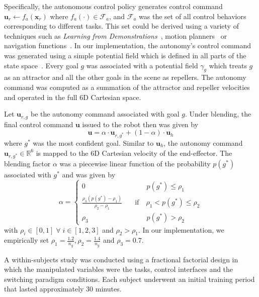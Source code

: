 \documentclass[journal]{IEEEtran}
\begin{document}
Specifically, the autonomous control policy generates control command $\boldsymbol{u}_r \leftarrow f_{a}(\boldsymbol{x}_r)$
where $f_{a}(\cdot) \in \mathcal{F}_{a}$, and $\mathcal{F}_{a}$ was the set of all control behaviors corresponding to different tasks. This set could be derived using a variety of techniques such as \textit{Learning from Demonstrations}~\cite{argall2009survey, schaal1997learning}, motion planners~\cite{hsu2002randomized,ratliff2009chomp} or navigation functions~\cite{rimon1992exact,tanner2003nonholonomic}.
In our implementation, the autonomy's control command was generated using a simple potential field which is defined in all parts of the state space~\cite{khatib1986real}. Every goal $g$ was associated with a potential field $\gamma_g$ which treats $g$ as an attractor and all the other goals in the scene as repellers. The autonomy command was computed as a summation of the attractor and repeller velocities and operated in the full 6D Cartesian space. 

Let $\boldsymbol{u}_{r,g}$ be the autonomy command associated with goal $g$. Under blending, the final control command $\boldsymbol{u}$ issued to the robot then was given by
\begin{equation*}
\boldsymbol{u} = \alpha\cdot \boldsymbol{u}_{r,g^*} + (1 - \alpha)\cdot \boldsymbol{u}_h
\end{equation*}
where $g^*$ was the most confident goal. Similar to $\boldsymbol{u}_h$, the autonomy command $\boldsymbol{u}_{r, g^*} \in \mathbb{R}^6$ is mapped to the 6D Cartesian velocity of the end-effector. 
The blending factor $\alpha$ was a piecewise linear function of the probability $p(g^*)$ associated with $g^*$ and was given by
$$
\alpha = \left\{
\begin{array}{ll}
0 & \quad\quad~~~ p(g^*) \leq \rho_1 \\
\frac{\rho_3 (p(g^*) - \rho_1)}{\rho_2 - \rho_1}  &  \quad \text{if}\quad \rho_1 < p(g^*) \leq \rho_2  \\
\rho_3 & \quad\quad~~~ p(g^*) > \rho_2 	
\end{array}
\right.
$$
with $\rho_i \in [0, 1] \;\forall\; i \in [1,2,3]$ and $ \rho_2 > \rho_1$. 
In our implementation, we empirically set $\rho_1 = \frac{1.2}{n_g}, \rho_2 = \frac{1.4}{n_g}$ and $ \rho_3 = 0.7$.

 A within-subjects study was conducted using a fractional factorial design in which the manipulated variables were the tasks, control interfaces and the switching paradigm conditions. Each subject underwent an initial training period that lasted approximately 30 minutes. 
\end{document}
